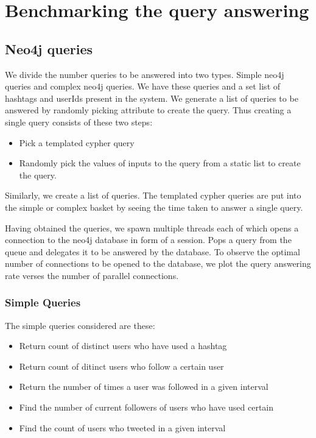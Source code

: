 \documentclass[letterpaper,10pt,english]{sphinxmanual}
\begin{document}
\chapter{Benchmarking the query answering}
\label{\detokenize{benchmarking:benchmarking-the-query-answering}}\label{\detokenize{benchmarking::doc}}

\section{Neo4j queries}
\label{\detokenize{benchmarking:neo4j-queries}}
We divide the number queries to be answered into two types. Simple  neo4j queries and complex neo4j queries. We have these queries and a set list of hashtags and userIds present in the system. We generate a list of queries to be answered by randomly picking attribute to create the query. Thus creating a single query consists of these two steps:
\begin{itemize}
\item {} 
Pick a templated cypher query

\item {} 
Randomly pick the values of inputs to the query from a static list to create the query.

\end{itemize}

Similarly, we create a list of queries. The templated cypher queries are put into the simple or complex basket by seeing the time taken to answer a single query.

Having obtained the queries, we spawn multiple threads each of which opens a connection to the neo4j database in form of a session. Pops a query from the queue and delegates it to be answered by the database. To observe the optimal number of connections to be opened to the database, we plot the query answering rate verses the number of parallel connections.


\subsection{Simple Queries}
\label{\detokenize{benchmarking:simple-queries}}
The simple queries considered are these:
\begin{itemize}
\item {} 
Return count of distinct users who have used a hashtag

\item {} 
Return count of ditinct users who follow a certain user

\item {} 
Return the number of times a user was followed in a given interval

\item {} 
Find the number of current followers of users who have used certain

\item {} 
Find the count of users who tweeted in a given interval

\end{itemize}
\end{document}
